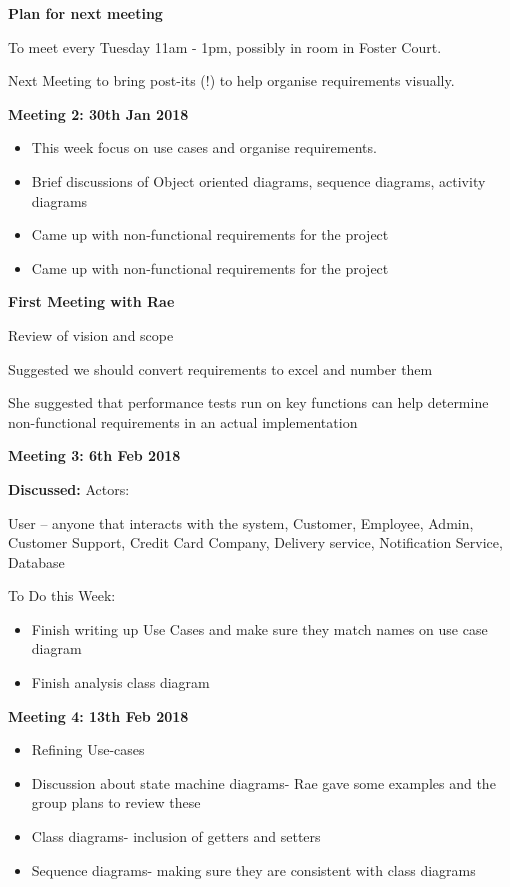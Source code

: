 \documentclass[fontsize=11pt]{extarticle}
\numberwithin{figure}{section} %
\numberwithin{table}{section}%
\begin{document}
\textbf{Plan for next meeting}

To meet every Tuesday 11am - 1pm, possibly in room in Foster Court.

Next Meeting to bring post-its (!) to help organise requirements visually.

\textbf{Meeting 2: 30th Jan 2018}



\begin{itemize}
  \item This week focus on use cases and organise requirements.
  \item Brief discussions of Object oriented diagrams, sequence diagrams, activity diagrams
  \item Came up with non-functional requirements for the project
  \item Came up with non-functional requirements for the project
 
\end{itemize}



\textbf{First Meeting with Rae}

Review of vision and scope

Suggested we should convert requirements to excel and number them

She suggested that performance tests run on key functions can help determine non-functional requirements in an actual implementation

\textbf{Meeting 3: 6th Feb 2018}

\textbf{Discussed:}
Actors:

User – anyone that interacts with the system, Customer, Employee, Admin, Customer Support, Credit Card Company, Delivery service, Notification Service, Database

To Do this Week:
\begin{itemize}
  \item Finish writing up Use Cases and make sure they match names on use case diagram
  \item Finish analysis class diagram

\end{itemize}

\textbf{Meeting 4: 13th Feb 2018}

\begin{itemize}
  \item Refining Use-cases
  \item Discussion about state machine diagrams- Rae gave some examples and the group plans to review these
  \item Class diagrams- inclusion of getters and setters
  \item Sequence diagrams- making sure they are consistent with class diagrams


\end{itemize}
\end{document}
